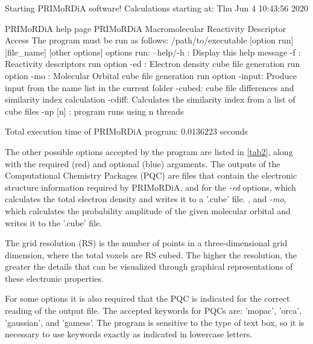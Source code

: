 \documentclass[a4paper,11pt]{refart}
\begin{document}
\hspace*{-\leftmarginwidth}
\begin{minipage}{\fullwidth}
	\begin{shell}
Starting PRIMoRDiA software! 
Calculations starting at: Thu Jun  4 10:43:56 2020
		
PRIMoRDiA help page
PRIMoRDiA Macromolecular Reactivity Descriptor Access
The program must be run as follows:
/path/to/executable [option run] [file\_name] [other options] 
options run:
--help/-h : Display this help message
-f    : Reactivity descriptors run option
-ed   : Electron density cube file generation run option
-mo   : Molecular Orbital cube file generation run option
-input: Produce input from the name list in the current folder
-cubed: cube file differences and similarity index calculation
-cdiff: Calculates the similarity index from a list of cube files
-np [n] : program runs using n threads
		
Total execution time of PRIMoRDiA program: 0.0136223 seconds
	\end{shell}
\end{minipage}

The other possible options accepted by the program are listed in \autoref{tab2}, along with the required (red) and optional (blue) arguments. The outputs of the Computational Chemistry Packages (PQC) are files that contain the electronic structure information required by PRIMoRDiA, and for the \emph{-ed} options, which calculates the total electron density and writes it to a '.cube' file. , and \emph{-mo}, which calculates the probability amplitude of the given molecular orbital and writes it to the '.cube' file.

The grid resolution (RS) is the number of points in a three-dimensional grid dimension, where the total voxels are RS cubed. The higher the resolution, the greater the details that can be visualized through graphical representations of these electronic properties.

For some options it is also required that the PQC is indicated for the correct reading of the output file. The accepted keywords for PQCs are: 'mopac', 'orca', 'gaussian', and 'gamess'. The program is sensitive to the type of text box, so it is necessary to use keywords exactly as indicated in lowercase letters.
\end{document}
